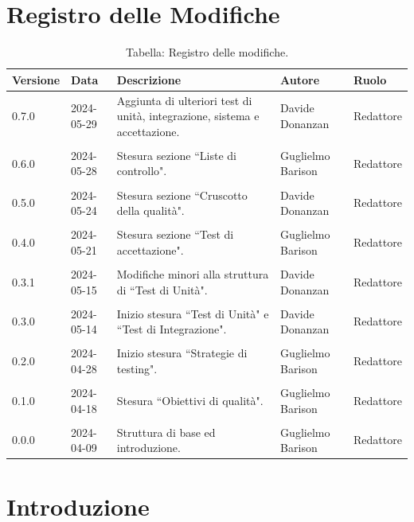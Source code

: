\documentclass[8pt]{article}
\begin{document}
\section*{Registro delle Modifiche}
\begin{table}[ht!]	
	\centering
	\begin{tabular}{p{1.2cm} p{2cm} p{6cm} p{3cm} p{2cm}}
		\toprule
		\textbf{Versione}& \textbf{Data} & \textbf{Descrizione} & \textbf{Autore} & \textbf{Ruolo} \\
		\midrule
        0.7.0 & 2024-05-29 & Aggiunta di ulteriori test di unità, integrazione, sistema e accettazione. & Davide Donanzan & Redattore \\\\
        0.6.0 & 2024-05-28 & Stesura sezione ``Liste di controllo". & Guglielmo Barison & Redattore \\\\
        0.5.0 & 2024-05-24 & Stesura sezione ``Cruscotto della qualità". & Davide Donanzan & Redattore \\\\
        0.4.0 & 2024-05-21 & Stesura sezione ``Test di accettazione". & Guglielmo Barison & Redattore \\\\
        0.3.1 & 2024-05-15 & Modifiche minori alla struttura di ``Test di Unità". & Davide Donanzan & Redattore \\\\
		0.3.0 & 2024-05-14 & Inizio stesura ``Test di Unità" e ``Test di Integrazione". & Davide Donanzan & Redattore \\\\
		0.2.0 & 2024-04-28 & Inizio stesura ``Strategie di testing". & Guglielmo Barison & Redattore \\\\
		0.1.0 & 2024-04-18 & Stesura ``Obiettivi di qualità". & Guglielmo Barison & Redattore \\\\
		0.0.0 & 2024-04-09 & Struttura di base ed introduzione.  & Guglielmo Barison & Redattore \\
		\bottomrule
	\end{tabular}
	\caption*{Tabella: Registro delle modifiche.}
	\label{table:Registro delle modifiche}
\end{table}
\newpage
\tableofcontents
\newpage
\listoffigures
\newpage
\listoftables
\newpage
\justifying
\section{Introduzione}
\end{document}
